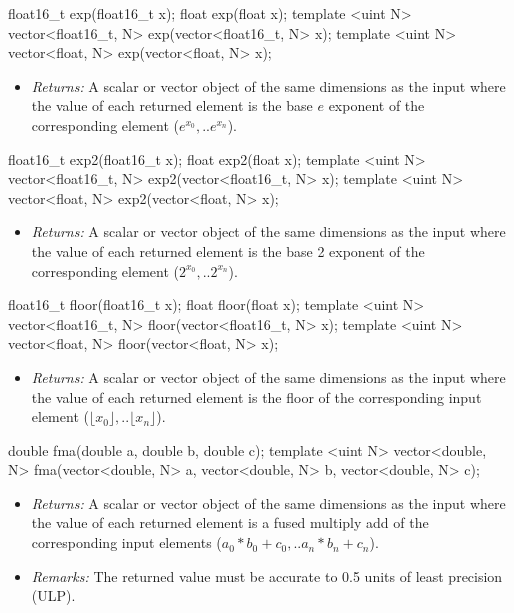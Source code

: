 \begin{HLSL}
float16_t exp(float16_t x);
float exp(float x);
template <uint N> vector<float16_t, N> exp(vector<float16_t, N> x);
template <uint N> vector<float, N> exp(vector<float, N> x);
\end{HLSL}

\begin{itemize}
  \item \textit{Returns:} A scalar or vector object of the same dimensions as
  the input where the value of each returned element is the base $e$ exponent of
  the corresponding element (\(e^{x_0}, .. e^{x_n}\)).
\end{itemize}

\begin{HLSL}
float16_t exp2(float16_t x);
float exp2(float x);
template <uint N> vector<float16_t, N> exp2(vector<float16_t, N> x);
template <uint N> vector<float, N> exp2(vector<float, N> x);
\end{HLSL}

\begin{itemize}
  \item \textit{Returns:} A scalar or vector object of the same dimensions as
  the input where the value of each returned element is the base 2 exponent of
  the corresponding element (\(2^{x_0}, .. 2^{x_n}\)).
\end{itemize}

\begin{HLSL}
float16_t floor(float16_t x);
float floor(float x);
template <uint N> vector<float16_t, N> floor(vector<float16_t, N> x);
template <uint N> vector<float, N> floor(vector<float, N> x);
\end{HLSL}

\begin{itemize}
  \item \textit{Returns:} A scalar or vector object of the same dimensions as
  the input where the value of each returned element is the floor of the
  corresponding input element (\(\lfloor x_0 \rfloor, .. \lfloor x_n \rfloor\)).
\end{itemize}

\begin{HLSL}
double fma(double a, double b, double c);
template <uint N>
vector<double, N> fma(vector<double, N> a, vector<double, N> b,
                      vector<double, N> c);
\end{HLSL}

\begin{itemize}
  \item \textit{Returns:} A scalar or vector object of the same dimensions as
  the input where the value of each returned element is a fused multiply add of
  the corresponding input elements (\(a_0 * b_0 + c_0, .. a_n * b_n + c_n\)).
  \item \textit{Remarks:} The returned value must be accurate to 0.5 units of
  least precision (ULP).
\end{itemize}

